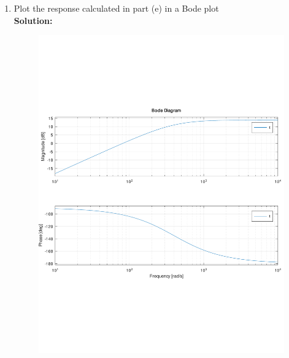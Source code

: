 \begin{enumerate}
        \item Plot the response calculated in part (e) in a Bode plot\\
            \textbf{Solution:}\\
            \begin{figure}[H]
                \centering
                \includegraphics[width=0.8\linewidth,trim={0 5cm 0 5cm},clip]{figures/bodeplot_prac2.pdf}
            \end{figure}
    \end{enumerate}